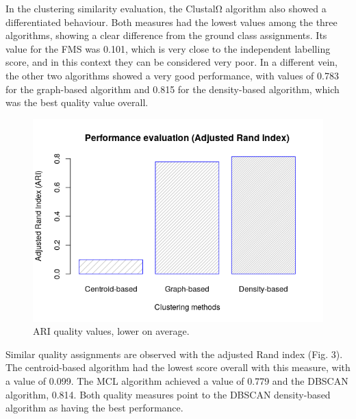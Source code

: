 \documentclass[nocrop]{bioinfo}
\begin{document}
In the clustering similarity evaluation, the ClustalΩ algorithm also showed a differentiated behaviour. Both measures had the lowest values among the three algorithms, showing a clear difference from the ground class assignments. Its value for the FMS was 0.101, which is very close to the independent labelling score, and in this context they can be considered very poor. In a different vein, the other two algorithms showed a very good performance, with values of 0.783 for the graph-based algorithm and 0.815 for the density-based algorithm, which was the best quality value overall. 
\begin{figure}[ht]
\centering
\includegraphics[scale=0.45]{img/ari.png}
\caption{ARI quality values, lower on average.}\label{fig:03}
\end{figure}

Similar quality assignments are observed with the adjusted Rand index (Fig. 3). The centroid-based algorithm had the lowest score overall with this measure, with a value of 0.099. The MCL algorithm achieved a value of 0.779 and the DBSCAN algorithm, 0.814. Both quality measures point to the DBSCAN density-based algorithm as having the best performance.
\end{document}
